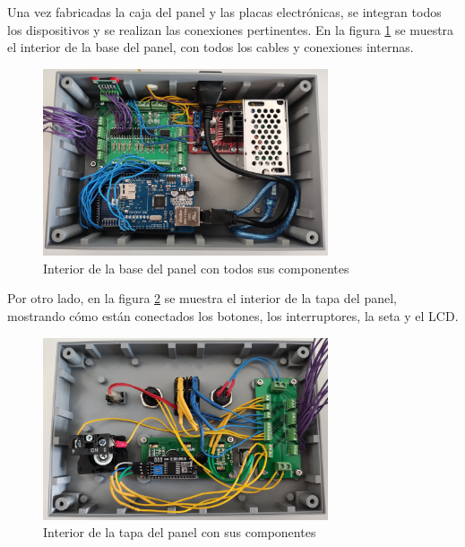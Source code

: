 Una vez fabricadas la caja del panel y las placas electrónicas, se integran todos 
los dispositivos y se realizan las conexiones pertinentes. En la figura \ref{fig:cajainterior}
se muestra el interior de la base del panel, con todos los cables y conexiones internas.

\begin{figure}[hbtp]%
    \centering 
        \includegraphics[width=0.75\textwidth]{07-resultados/cajainterior.jpg}
    \caption{Interior de la base del panel con todos sus componentes}
    \label{fig:cajainterior} 
\end{figure}

Por otro lado, en la figura \ref{fig:cajatapainterior} se muestra el interior de la tapa del panel, mostrando cómo están conectados los botones, los interruptores, la seta y el LCD.

\begin{figure}[hbtp]
    \centering 
        \includegraphics[width=0.75\textwidth]{07-resultados/cajatapa.jpg}
    \caption{Interior de la tapa del panel con sus componentes}
    \label{fig:cajatapainterior} 
\end{figure}
